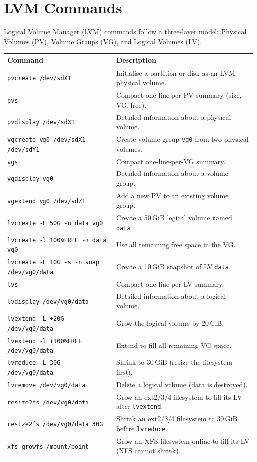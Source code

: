 \section*{LVM Commands}

Logical Volume Manager (LVM) commands follow a three-layer model: Physical
Volumes (PV), Volume Groups (VG), and Logical Volumes (LV).

\begin{longtable}{p{4cm} p{8cm}}
\toprule
\textbf{Command} & \textbf{Description} \\
\midrule
\endhead
\texttt{pvcreate /dev/sdX1} & Initialise a partition or disk as an LVM physical volume. \\
\texttt{pvs} & Compact one-line-per-PV summary (size, VG, free). \\
\texttt{pvdisplay /dev/sdX1} & Detailed information about a physical volume. \\
\texttt{vgcreate vg0 /dev/sdX1 /dev/sdY1} & Create volume group \texttt{vg0} from two physical volumes. \\
\texttt{vgs} & Compact one-line-per-VG summary. \\
\texttt{vgdisplay vg0} & Detailed information about a volume group. \\
\texttt{vgextend vg0 /dev/sdZ1} & Add a new PV to an existing volume group. \\
\texttt{lvcreate -L 50G -n data vg0} & Create a 50\,GiB logical volume named \texttt{data}. \\
\texttt{lvcreate -l 100\%FREE -n data vg0} & Use all remaining free space in the VG. \\
\texttt{lvcreate -L 10G -s -n snap /dev/vg0/data} & Create a 10\,GiB snapshot of LV \texttt{data}. \\
\texttt{lvs} & Compact one-line-per-LV summary. \\
\texttt{lvdisplay /dev/vg0/data} & Detailed information about a logical volume. \\
\texttt{lvextend -L +20G /dev/vg0/data} & Grow the logical volume by 20\,GiB. \\
\texttt{lvextend -l +100\%FREE /dev/vg0/data} & Extend to fill all remaining VG space. \\
\texttt{lvreduce -L 30G /dev/vg0/data} & Shrink to 30\,GiB (resize the filesystem first). \\
\texttt{lvremove /dev/vg0/data} & Delete a logical volume (data is destroyed). \\
\texttt{resize2fs /dev/vg0/data} & Grow an ext2/3/4 filesystem to fill its LV after \texttt{lvextend}. \\
\texttt{resize2fs /dev/vg0/data 30G} & Shrink an ext2/3/4 filesystem to 30\,GiB before \texttt{lvreduce}. \\
\texttt{xfs\_growfs /mount/point} & Grow an XFS filesystem online to fill its LV (XFS cannot shrink). \\
\bottomrule
\end{longtable}

